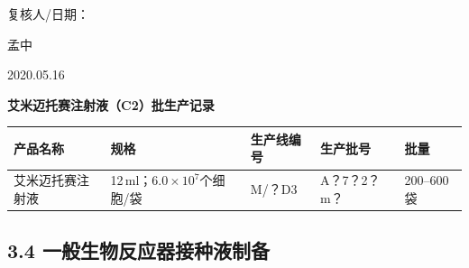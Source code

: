 \documentclass[UTF8,10pt,a4paper,fontset=fandol]{ctexart}
\newcommand{\fieldvalue}[1]{#1}
\newcommand{\handwritten}[1]{#1}
\begin{document}
\hfill
复核人/日期：

\fieldvalue{\handwritten{孟中}}

\quad

\fieldvalue{\handwritten{2020.05.16}}

\newpage

\begin{center}
\textbf{艾米迈托赛注射液（C2）批生产记录}
\end{center}

\begin{tabularx}{\textwidth}{|l|X|X|X|l|}
\hline
产品名称 & 规格 & 生产线编号 & 生产批号 & 批量 \\
\hline
\fieldvalue{艾米迈托赛注射液} &
\fieldvalue{12\,ml；$6.0\times10^{7}$个细胞/袋} &
\fieldvalue{\handwritten{M/？D3}} &
\fieldvalue{\handwritten{A？7？2？m？}} &
\fieldvalue{200--600袋} \\
\hline
\end{tabularx}

\subsection*{3.4 一般生物反应器接种液制备}
\end{document}

